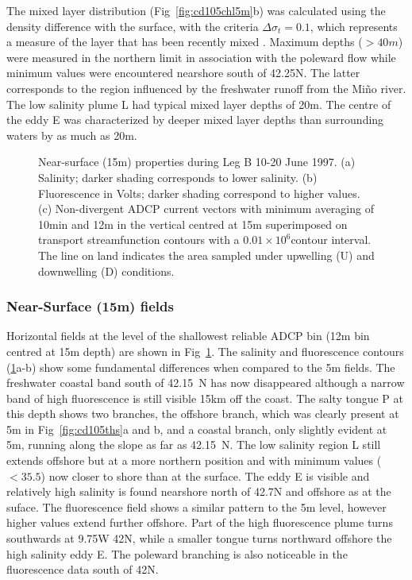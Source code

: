The mixed layer distribution (Fig~\ref{fig:cd105chl5m}b) was
calculated using the density difference with the surface, with the
criteria $\Delta \sigma_{t}=0.1$\dens, which represents a measure
of the layer that has been recently mixed \citep{Brainerd95}.
Maximum depths ($>40m$) were measured in the northern limit in
association with the poleward flow while minimum values were
encountered nearshore south of 42.25\deg N. The latter corresponds
to the region influenced by the freshwater runoff from the
Mi\~{n}o river. The low salinity plume L had typical mixed layer
depths of 20m. The centre of the eddy E was characterized by
deeper mixed layer depths than surrounding waters by as much as
20m.

\begin{figure}[ht]
\begin{widefig}{-.5cm}{-.7cm}
\centering {}%
 
\caption{Near-surface (15m) properties during Leg B 10-20 June
1997. (a) Salinity; darker shading corresponds to lower salinity.
(b) Fluorescence in Volts; darker shading correspond to higher
values. (c) Non-divergent ADCP current vectors with minimum
averaging of 10min and 12m in the vertical centred at 15m
superimposed on transport streamfunction contours with a
$0.01\times 10^{6}$\tra contour interval. The line on land
indicates the area sampled under upwelling (U) and downwelling (D)
conditions.} \label{fig:cd105_15m}
\end{widefig}\end{figure}

\subsubsection{Near-Surface (15m) fields} Horizontal fields at the
level of the shallowest reliable ADCP bin (12m bin centred at 15m
depth) are shown in Fig~\ref{fig:cd105_15m}. The salinity and
fluorescence contours (\ref{fig:cd105_15m}a-b) show some
fundamental differences when compared to the 5m fields. The
freshwater coastal band south of 42.15\deg~N has now disappeared
although a narrow band of high fluorescence is still visible 15km
off the coast. The salty tongue P at this depth shows two
branches, the offshore branch, which was clearly present at 5m in
Fig~\ref{fig:cd105ths}a and b, and a coastal branch, only slightly
evident at 5m, running along the slope as far as 42.15\deg~N. The
low salinity region L still extends offshore but at a more
northern position and with minimum values ($<35.5$) now closer to
shore than at the surface. The eddy E is visible and relatively
high salinity is found nearshore north of 42.7\deg N and offshore
as at the suface. The fluorescence field shows a similar pattern
to the 5m level, however higher values extend further offshore.
Part of the high fluorescence plume turns southwards at 9.75\deg W
42\deg N, while a smaller tongue turns northward offshore the high
salinity eddy E. The poleward branching is also noticeable in the
fluorescence data south of 42\deg N.


